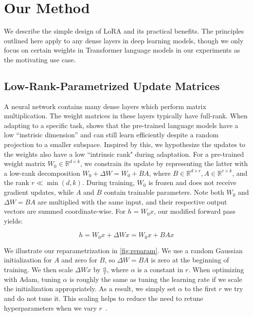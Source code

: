 \section{Our Method}

We describe the simple design of LoRA and its practical benefits. The principles outlined here apply to any dense layers in deep learning models, though we only focus on certain weights in Transformer language models in our experiments as the motivating use case.

\subsection{Low-Rank-Parametrized Update Matrices} A neural network contains many dense layers which perform matrix multiplication. The weight matrices in these layers typically have full-rank. When adapting to a specific task, \citet{aghajanyan_intrinsic_2020} shows that the pre-trained language models have a low ``instrisic dimension'' and can still learn efficiently despite a random projection to a smaller subspace. Inspired by this, we hypothesize the updates to the weights also have a low ``intrinsic rank" during adaptation. For a pre-trained weight matrix $W_0\in \mathbb{R}^{d\times k}$, we constrain its update by representing the latter with a low-rank decomposition $W_0+\Delta W=W_0+BA$, where $B\in \mathbb{R}^{d\times r}, A\in \mathbb{R}^{r\times k}$, and the rank $r \ll \min(d,k)$.
During training, $W_0$ is frozen and does not receive gradient updates, while $A$ and $B$ contain trainable parameters. Note both $W_0$ and $\Delta W=BA$ are multiplied with the same input, and their respective output vectors are summed coordinate-wise. For $h = W_0x$, our modified forward pass yields:

\begin{equation}
h = W_0 x + \Delta W x = W_0 x + BA x
\label{eq:lora}
\end{equation}

We illustrate our reparametrization in \autoref{fig:reparam}.
We use a random Gaussian initialization for $A$ and zero for $B$, so $\Delta W=BA$ is zero at the beginning of training. We then scale $\Delta W x$ by $\frac{\alpha}{r}$, where $\alpha$ is a constant in $r$. When optimizing with Adam, tuning $\alpha$ is roughly the same as tuning the learning rate if we scale the initialization appropriately. As a result, we simply set $\alpha$ to the first $r$ we try and do not tune it. This scaling helps to reduce the need to retune hyperparameters when we vary $r$~\citep{yang_feature_2021}.

